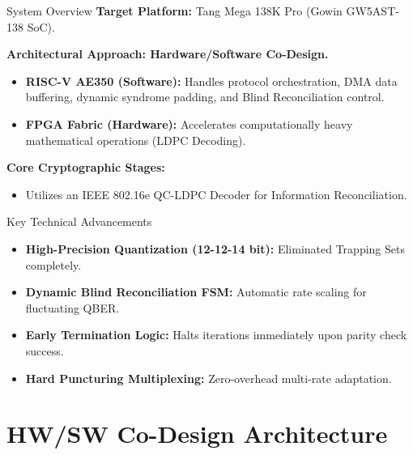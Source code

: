 \documentclass[t, aspectratio=169]{beamer}
\begin{document}
	\begin{frame}{System Overview}
		\textbf{Target Platform:} Tang Mega 138K Pro (Gowin GW5AST-138 SoC).
        
        \vspace{0.5em}
		\textbf{Architectural Approach: Hardware/Software Co-Design.}
		\begin{itemize}
			\item \textbf{RISC-V AE350 (Software):} Handles protocol orchestration, DMA data buffering, dynamic syndrome padding, and Blind Reconciliation control.
			\item \textbf{FPGA Fabric (Hardware):} Accelerates computationally heavy mathematical operations (LDPC Decoding).
		\end{itemize}
        
        \vspace{0.5em}
        \textbf{Core Cryptographic Stages:}
        \begin{itemize}
            \item Utilizes an IEEE 802.16e QC-LDPC Decoder for Information Reconciliation.
        \end{itemize}
	\end{frame}
	
	\begin{frame}{Key Technical Advancements}
		\begin{itemize}
			\item \textbf{High-Precision Quantization (12-12-14 bit):} Eliminated Trapping Sets completely.
			\item \textbf{Dynamic Blind Reconciliation FSM:} Automatic rate scaling for fluctuating QBER.
			\item \textbf{Early Termination Logic:} Halts iterations immediately upon parity check success.
			\item \textbf{Hard Puncturing Multiplexing:} Zero-overhead multi-rate adaptation.
		\end{itemize}
	\end{frame}

	\section{HW/SW Co-Design Architecture}
	\useStyleLogoOnly 
	\useThickBar      
	
\end{document}

